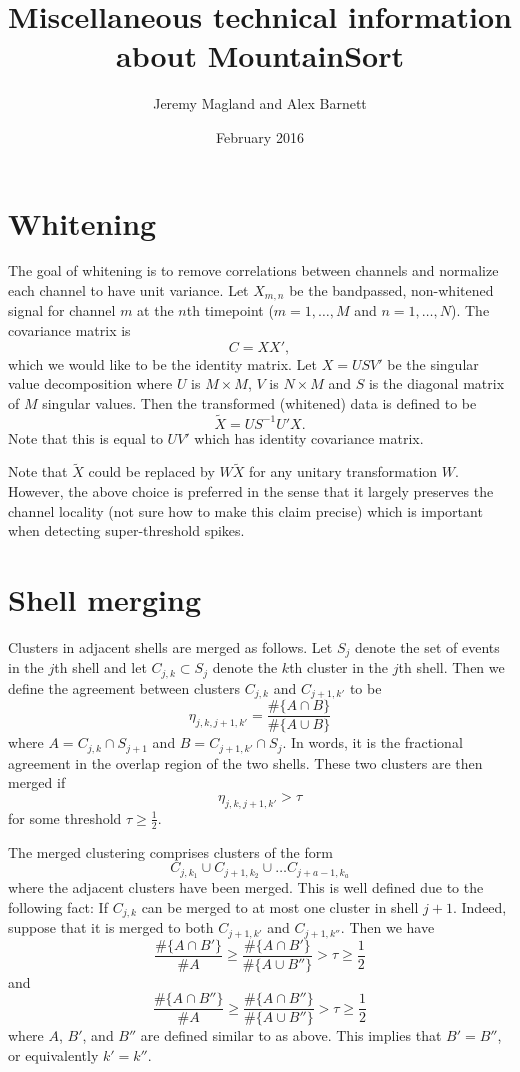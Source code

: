 \documentclass{article}
\title{Miscellaneous technical information about MountainSort}
\author{Jeremy Magland and Alex Barnett}
\date{February 2016}
\begin{document}
\maketitle

\section{Whitening}

The goal of whitening is to remove correlations between channels and normalize each channel to have unit variance. Let $X_{m,n}$ be the bandpassed, non-whitened signal for channel $m$ at the $n$th timepoint ($m=1,\dots,M$ and $n=1,\dots,N$). The covariance matrix is
$$C=X X',$$
which we would like to be the identity matrix. Let
$X=USV'$ be the singular value decomposition where $U$ is $M\times M$, $V$ is $N\times M$ and $S$ is the diagonal matrix of $M$ singular values.
Then the transformed (whitened) data is defined to be
$$\tilde{X}=US^{-1}U'X.$$
Note that this is equal to $UV'$ which has identity covariance matrix.

Note that $\tilde{X}$ could be replaced by $W\tilde{X}$ for any unitary transformation $W$. However, the above choice is preferred in the sense that it largely preserves the channel locality (not sure how to make this claim precise) which is important when detecting super-threshold spikes.

\section{Shell merging}

Clusters in adjacent shells are merged as follows. Let $S_j$ denote the set of events in the $j$th shell and let $C_{j,k}\subset S_j$ denote the $k$th cluster in the $j$th shell. Then we define the agreement between clusters $C_{j,k}$ and $C_{j+1,k'}$ to be
$$\eta_{j,k,j+1,k'}=\frac{\#\{A\cap B\}}{\#\{A\cup B\}}$$ where
$A=C_{j,k}\cap S_{j+1}$ and $B=C_{j+1,k'}\cap S_j$. In words, it is the fractional agreement in the overlap region of the two shells. These two clusters are then merged if 
$$\eta_{j,k,j+1,k'}>\tau$$ for some threshold $\tau\geq \frac{1}{2}$.

The merged clustering comprises clusters of the form
$$C_{j,k_1}\cup C_{j+1,k_2}\cup\dots C_{j+a-1,k_a}$$
where the adjacent clusters have been merged. This is well defined due to the following fact: If $C_{j,k}$ can be merged to at most one cluster in shell $j+1$. Indeed, suppose that it is merged to both $C_{j+1,k'}$ and $C_{j+1,k''}$. Then we have
$$\frac{\#\{A\cap B'\}}{\#A}\geq\frac{\#\{A\cap B'\}}{\#\{A\cup B''\}}>\tau\geq\frac{1}{2}$$
and
$$\frac{\#\{A\cap B''\}}{\#A}\geq\frac{\#\{A\cap B''\}}{\#\{A\cup B''\}}>\tau\geq\frac{1}{2}$$
where $A$, $B'$, and $B''$ are defined similar to as above. This implies that $B'=B''$, or equivalently $k'=k''$.
\end{document}
